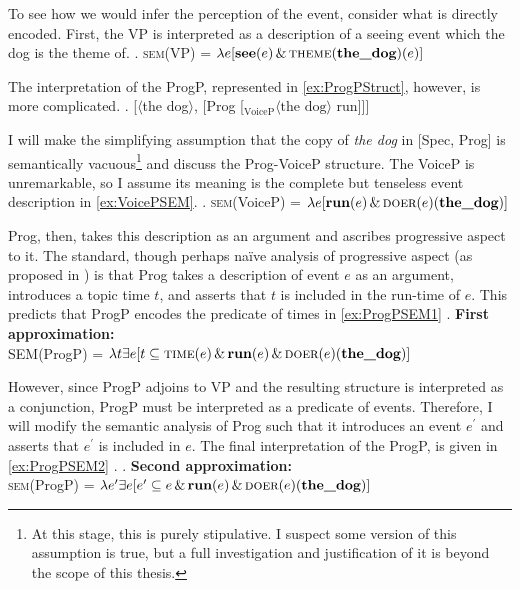 \documentclass[MilwayThesis]{subfiles}
\begin{document}
To see how we would infer the perception of the event, consider what is directly encoded.
First, the VP is interpreted as a description of a seeing event which the dog is the theme of.
\ex.\label{ex:VPSEM} \textsc{sem}(VP) = $\lambda e [\textbf{see}(e)\,\&\,\textsc{theme}(\textbf{the\_dog})(e)]$

The interpretation of the ProgP, represented in \cref{ex:ProgPStruct}, however, is more complicated.
\ex.\label{ex:ProgPStruct} [$\langle$the dog$\rangle$, [Prog [$_\text{VoiceP} \langle\text{the dog}\rangle$ run]]]

I will make the simplifying assumption that the copy of \textit{the dog} in [Spec, Prog] is semantically vacuous\footnote{
	At this stage, this is purely stipulative.
	I suspect some version of this assumption is true, but a full investigation and justification of it is beyond the scope of this thesis.
} and discuss the Prog-VoiceP structure.
The VoiceP is unremarkable, so I assume its meaning is the complete but tenseless event description in \cref{ex:VoicePSEM}.
\ex.\label{ex:VoicePSEM} \textsc{sem}(VoiceP) = $\lambda e [\textbf{run}(e)\,\&\,\textsc{doer}(e)(\textbf{the\_dog})]$

Prog, then, takes this description as an argument and ascribes progressive aspect to it.
The standard, though perhaps na\"ive analysis of progressive aspect (as proposed in \cite{klein1994time}) is that Prog takes a description of event $e$ as an argument, introduces a topic time $t$, and asserts that $t$ is included in the run-time of $e$.
This predicts that ProgP encodes the predicate of times in \cref{ex:ProgPSEM1}
\ex.\label{ex:ProgPSEM1} \textbf{First approximation:}\\\textsc{SEM}(ProgP) =  $\lambda t \exists e [t \subseteq \textsc{time}(e)\,\&\,\textbf{run}(e)\,\&\,\textsc{doer}(e)(\textbf{the\_dog})]$

However, since ProgP adjoins to VP and the resulting structure is interpreted as a conjunction, ProgP must be interpreted as a predicate of events.
Therefore, I will modify the semantic analysis of Prog such that it introduces an event $e^{\prime}$ and asserts that $e^{\prime}$ is included in $e$.
The final interpretation of the ProgP, is given in \cref{ex:ProgPSEM2} \parencite[cf.][]{bjorkman2018poster}.
\ex.\label{ex:ProgPSEM2} \textbf{Second approximation:}\\\textsc{sem}(ProgP) =  $\lambda e^{\prime} \exists e [e^{\prime} \subseteq e\,\&\,\textbf{run}(e)\,\&\,\textsc{doer}(e)(\textbf{the\_dog})]$
\end{document}
